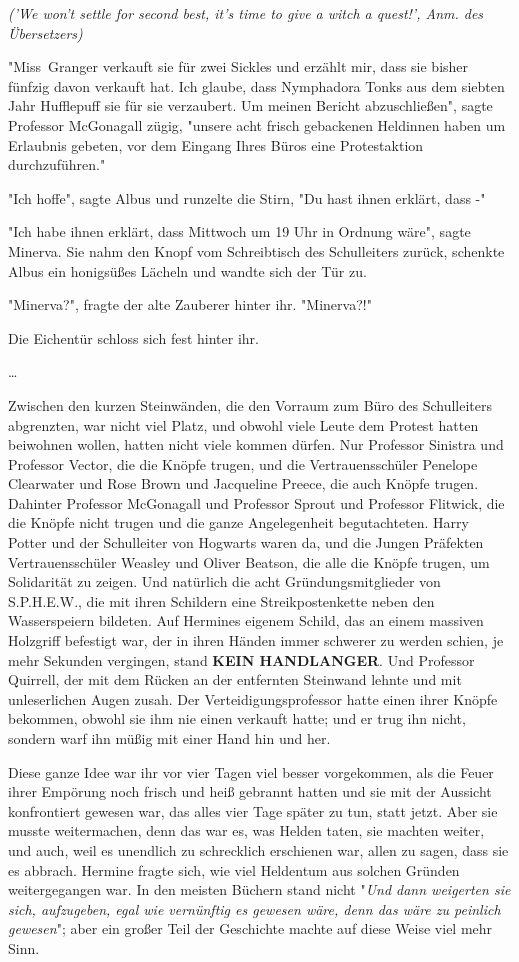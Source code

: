 {\emph{('We won't settle for second best, it's time to give a witch a quest!', Anm. des Übersetzers)}

"Miss~Granger verkauft sie für zwei Sickles und erzählt mir, dass sie bisher fünfzig davon verkauft hat. Ich glaube, dass Nymphadora Tonks aus dem siebten Jahr Hufflepuff sie für sie verzaubert. Um meinen Bericht abzuschließen", sagte Professor McGonagall zügig, "unsere acht frisch gebackenen Heldinnen haben um Erlaubnis gebeten, vor dem Eingang Ihres Büros eine Protestaktion durchzuführen."

"Ich hoffe", sagte Albus und runzelte die Stirn, "Du hast ihnen erklärt, dass -"

"Ich habe ihnen erklärt, dass Mittwoch um 19 Uhr in Ordnung wäre", sagte Minerva. Sie nahm den Knopf vom Schreibtisch des Schulleiters zurück, schenkte Albus ein honigsüßes Lächeln und wandte sich der Tür zu.

"Minerva?", fragte der alte Zauberer hinter ihr. "Minerva?!"

Die Eichentür schloss sich fest hinter ihr.

…

Zwischen den kurzen Steinwänden, die den Vorraum zum Büro des Schulleiters abgrenzten, war nicht viel Platz, und obwohl viele Leute dem Protest hatten beiwohnen wollen, hatten nicht viele kommen dürfen. Nur Professor Sinistra und Professor Vector, die die Knöpfe trugen, und die Vertrauensschüler Penelope Clearwater und Rose Brown und Jacqueline Preece, die auch Knöpfe trugen. Dahinter Professor McGonagall und Professor Sprout und Professor Flitwick, die die Knöpfe nicht trugen und die ganze Angelegenheit begutachteten. Harry Potter und der Schulleiter von Hogwarts waren da, und die Jungen Präfekten Vertrauensschüler Weasley und Oliver Beatson, die alle die Knöpfe trugen, um Solidarität zu zeigen. Und natürlich die acht Gründungsmitglieder von S.P.H.E.W., die mit ihren Schildern eine Streikpostenkette neben den Wasserspeiern bildeten. Auf Hermines eigenem Schild, das an einem massiven Holzgriff befestigt war, der in ihren Händen immer schwerer zu werden schien, je mehr Sekunden vergingen, stand \textbf{KEIN HANDLANGER}. Und Professor Quirrell, der mit dem Rücken an der entfernten Steinwand lehnte und mit unleserlichen Augen zusah. Der Verteidigungsprofessor hatte einen ihrer Knöpfe bekommen, obwohl sie ihm nie einen verkauft hatte; und er trug ihn nicht, sondern warf ihn müßig mit einer Hand hin und her.

Diese ganze Idee war ihr vor vier Tagen viel besser vorgekommen, als die Feuer ihrer Empörung noch frisch und heiß gebrannt hatten und sie mit der Aussicht konfrontiert gewesen war, das alles vier Tage später zu tun, statt jetzt. Aber sie musste weitermachen, denn das war es, was Helden taten, sie machten weiter, und auch, weil es unendlich zu schrecklich erschienen war, allen zu sagen, dass sie es abbrach. Hermine fragte sich, wie viel Heldentum aus solchen Gründen weitergegangen war. In den meisten Büchern stand nicht "\emph{Und dann weigerten sie sich, aufzugeben, egal wie vernünftig es gewesen wäre, denn das wäre zu peinlich gewesen}"; aber ein großer Teil der Geschichte machte auf diese Weise viel mehr Sinn.

}
